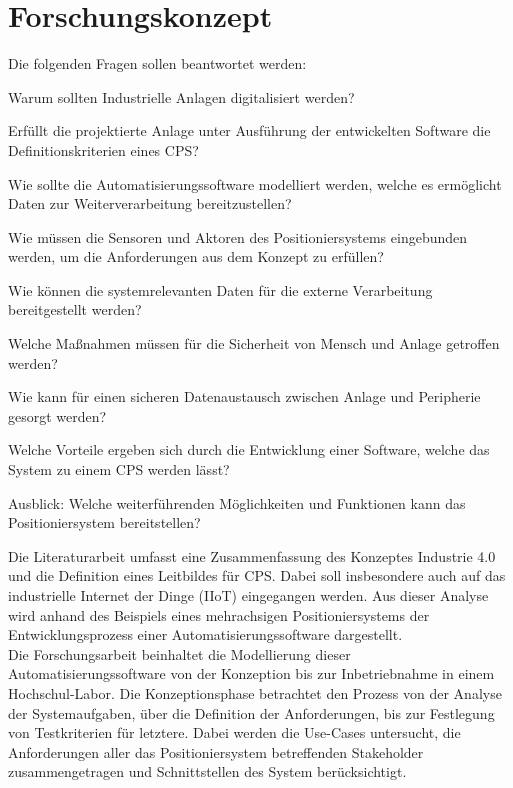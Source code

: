 \documentclass[12pt, a4paper, twoside]{article} %
\begin{document}
\section{Forschungskonzept}
Die folgenden Fragen sollen beantwortet werden:
\begin{compactitem}
	\item Warum sollten Industrielle Anlagen digitalisiert werden?
	\item Erfüllt die projektierte Anlage unter Ausführung der entwickelten Software die Definitionskriterien eines CPS?
	\item Wie sollte die Automatisierungssoftware modelliert werden, welche es ermöglicht Daten zur Weiterverarbeitung bereitzustellen?
	\item Wie müssen die Sensoren und Aktoren des Positioniersystems eingebunden werden, um die Anforderungen aus dem Konzept zu erfüllen?
	\item Wie können die systemrelevanten Daten für die externe Verarbeitung bereitgestellt werden?
	\item Welche Maßnahmen müssen für die Sicherheit von Mensch und Anlage getroffen werden?
	\item Wie kann für einen sicheren Datenaustausch zwischen Anlage und Peripherie gesorgt werden?
	\item Welche Vorteile ergeben sich durch die Entwicklung einer Software, welche das System zu einem CPS werden lässt?
	\item Ausblick: Welche weiterführenden Möglichkeiten und Funktionen kann das Positioniersystem bereitstellen?
\end{compactitem}
Die Literaturarbeit umfasst eine Zusammenfassung des Konzeptes Industrie 4.0 und die Definition eines Leitbildes für CPS.
Dabei soll insbesondere auch auf das industrielle Internet der Dinge (IIoT) eingegangen werden. Aus dieser Analyse wird anhand des Beispiels eines mehrachsigen Positioniersystems der Entwicklungsprozess einer Automatisierungssoftware dargestellt.\\
Die Forschungsarbeit beinhaltet die Modellierung dieser Automatisierungssoftware von der Konzeption bis zur Inbetriebnahme in einem Hochschul-Labor. Die Konzeptionsphase betrachtet den Prozess von der Analyse der Systemaufgaben, über die Definition der Anforderungen, bis zur Festlegung von Testkriterien für letztere. Dabei werden die Use-Cases untersucht, die Anforderungen aller das Positioniersystem betreffenden Stakeholder zusammengetragen und Schnittstellen des System berücksichtigt.\\
\end{document}

